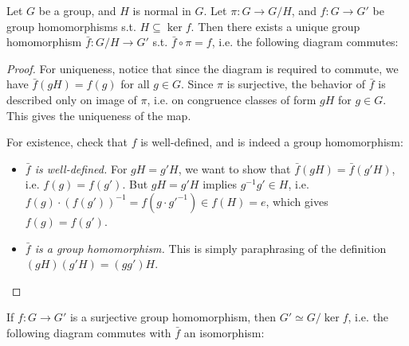 \documentclass{article}
\begin{document}
\begin{proposition}\label{prop: universal property of quotient group}
    Let $G$ be a group, and $H$ is normal in $G$. Let $\pi: G \to G/H$, and $f: G \to G'$ be group homomorphisms s.t. $H \subseteq \ker f$. Then there exists a unique group homomorphism $\bar{f} : G/H \to G'$ s.t. $\bar{f} \circ \pi = f$, i.e. the following diagram commutes:

    \begin{minipage}{\linewidth}
        \centering
    \end{minipage}
\end{proposition}

\begin{proof}
    For uniqueness, notice that since the diagram is required to commute, we have $\bar{f} (gH) = f(g)$ for all $g \in G$. Since $\pi$ is surjective, the behavior of $\bar{f}$ is described only on image of $\pi$, i.e. on congruence classes of form $gH$ for $g \in G$. This gives the uniqueness of the map.
    
    For existence, check that $f$ is well-defined, and is indeed a group homomorphism:
    \begin{itemize}
        \item \emph{$\bar{f}$ is well-defined.} For $gH = g'H$, we want to show that $\bar{f}(gH) = \bar{f}(g'H)$, i.e. $f(g) = f(g')$. But $gH = g'H$ implies $g^{-1}g' \in H$, i.e. $f(g) \cdot (f(g'))^{-1} = f(g\cdot {g'}^{-1}) \in f(H) = e$, which gives $f(g) = f(g')$.
        \item \emph{$\bar{f}$ is a group homomorphism.} This is simply paraphrasing of the definition $(gH)(g'H) = (gg')H$.
    \end{itemize}
\end{proof}

\begin{theorem} \label{thm: first isomorphism theorem}
    If $f: G \to G'$ is a surjective group homomorphism, then $G' \simeq G / \ker f$, i.e. the following diagram commutes with $\bar{f}$ an isomorphism:

    \begin{minipage}{\linewidth}
        \centering
    \end{minipage}
\end{theorem}
\end{document}
